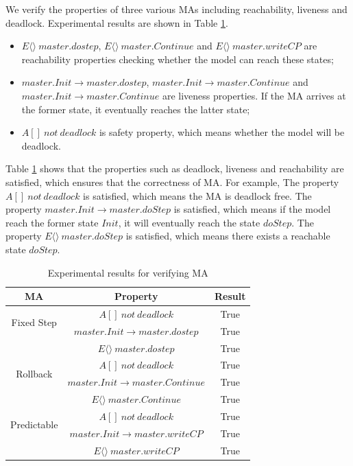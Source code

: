 We verify the properties of three various MAs including reachability, liveness and deadlock. Experimental results are shown in Table \ref{ta_r}.

\begin{itemize}
\item
$E \langle\rangle ~master.dostep$, $E\langle\rangle~master.Continue$ and $E\langle\rangle~master.writeCP$ are reachability properties checking whether the model can reach these states;
\item
$master.Init \rightarrow master.dostep$, $master.Init \rightarrow master.Continue$ and $master.Init \rightarrow master.Continue$ are liveness properties. If the MA arrives at the former state, it eventually reaches the latter state;
\item
$A[]~not~deadlock$ is safety property, which means whether the model will be deadlock.
\end{itemize}

Table \ref{ta_r} shows that the properties such as deadlock, liveness and reachability are satisfied, which ensures that the correctness of MA. For example, The property $A[]~not~deadlock$ is satisfied, which means the MA is deadlock free. The property $master.Init \rightarrow master.doStep$ is satisfied, which means if the model reach the former state $Init$, it will eventually reach the state $doStep$. The property $E\langle\rangle~master.doStep$ is satisfied, which means there exists a reachable state $doStep$. 

\begin{table}
\caption{Experimental results for verifying MA}
\centering
\begin{tabular}{c c c}
        \hline
        MA & Property & Result\\
        \hline
        \multirow{2}{2.0cm}{Fixed Step}
                & $A[]~not~deadlock$ & True\\
                & $master.Init \rightarrow master.dostep$ & True\\
                & $E\langle\rangle~master.dostep$ & True\\

        \hline
        \multirow{2}{2.0cm}{Rollback}
                & $A[]~not~deadlock$ & True\\
                & $master.Init \rightarrow master.Continue$ & True\\
                & $E\langle\rangle~master.Continue$ & True\\

        \hline
        \multirow{2}{2.0cm}{Predictable}
                & $A[]~not~deadlock$ & True\\
                & $master.Init \rightarrow  master.writeCP$ & True\\
                & $E\langle\rangle~master.writeCP$ & True\\
        \hline
\end{tabular}
\label{ta_r}
\end{table}

